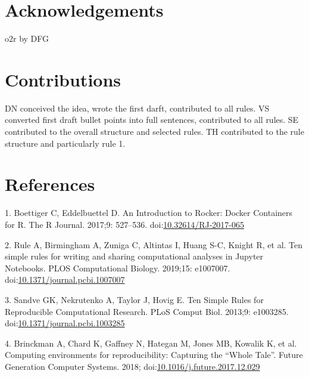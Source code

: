 \documentclass[10pt,letterpaper]{article}
\begin{document}
\hypertarget{acknowledgements}{%
\section*{Acknowledgements}\label{acknowledgements}}

o2r by DFG

\hypertarget{contributions}{%
\section*{Contributions}\label{contributions}}

DN conceived the idea, wrote the first darft, contributed to all rules.
VS converted first draft bullet points into full sentences, contributed
to all rules. SE contributed to the overall structure and selected
rules. TH contributed to the rule structure and particularly rule 1.

\hypertarget{references}{%
\section*{References}\label{references}}

\hypertarget{refs}{}
\leavevmode\hypertarget{ref-boettiger_introduction_2017}{}%
1. Boettiger C, Eddelbuettel D. An Introduction to Rocker: Docker
Containers for R. The R Journal. 2017;9: 527--536.
doi:\href{https://doi.org/10.32614/RJ-2017-065}{10.32614/RJ-2017-065}

\leavevmode\hypertarget{ref-rule_ten_2019}{}%
2. Rule A, Birmingham A, Zuniga C, Altintas I, Huang S-C, Knight R, et
al. Ten simple rules for writing and sharing computational analyses in
Jupyter Notebooks. PLOS Computational Biology. 2019;15: e1007007.
doi:\href{https://doi.org/10.1371/journal.pcbi.1007007}{10.1371/journal.pcbi.1007007}

\leavevmode\hypertarget{ref-sandve_ten_2013}{}%
3. Sandve GK, Nekrutenko A, Taylor J, Hovig E. Ten Simple Rules for
Reproducible Computational Research. PLoS Comput Biol. 2013;9: e1003285.
doi:\href{https://doi.org/10.1371/journal.pcbi.1003285}{10.1371/journal.pcbi.1003285}

\leavevmode\hypertarget{ref-brinckman_computing_2018}{}%
4. Brinckman A, Chard K, Gaffney N, Hategan M, Jones MB, Kowalik K, et
al. Computing environments for reproducibility: Capturing the ``Whole
Tale''. Future Generation Computer Systems. 2018;
doi:\href{https://doi.org/10.1016/j.future.2017.12.029}{10.1016/j.future.2017.12.029}
\end{document}
